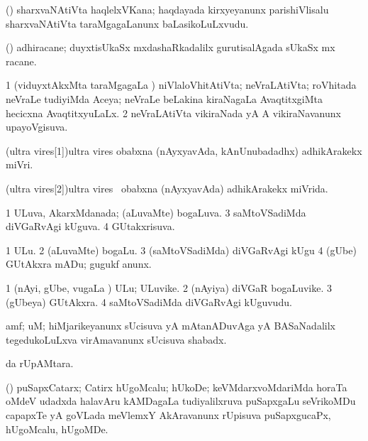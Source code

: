 \bentry
{}
\gl{\nA}
\expl{}
\bmng
(\veYshA) sharxvaNAtiVta haqlelxVKana; haqdayada kirxyeyanunx parishiVlisalu sharxvaNAtiVta taraMgagaLanunx baLasikoLuLxvudu. 
\emng
\eentry

\bentry
{} 
\gl{\nA}
\expl{}
\bmng
(\jiVvi) adhiracane; duyxtisUkaSx mxdashaRkadalilx  gurutisalAgada sUkaSx mx racane. 
\emng
\eentry

\bentry
{} 
\gl{\gu}
\expl{}
\bmng
\bnum
\num{1} (viduyxtAkxMta taraMgagaLa \vi) niVlaloVhitAtiVta; neVraLAtiVta; roVhitada neVraLe tudiyiMda Aceya; neVraLe beLakina kiraNagaLa AvaqtitxgiMta hecicxna AvaqtitxyuLaLx. 
\num{2} neVraLAtiVta vikiraNada yA A vikiraNavanunx upayoVgisuva. 
\enum
\emng
\eentry

\bentry
\wordf(ultra vires[1]){ultra vires} 
\gl{\kirxvi}
\expl{\Latin}
\bmng
obabxna (nAyxyavAda, kAnUnubadadhx) adhikArakekx miVri. 
\emng
\eentry

\bentry
\wordf(ultra vires[2]){ultra vires} 
\gl{\gu}
\expl{\Latin}
\bmng
\kanu\ obabxna (nAyxyavAda) adhikArakekx miVrida. 
\emng
\eentry

\bentry
{} 
\gl{\gu}
\expl{}
\bmng
\bnum
\num{1} ULuva, AkarxMdanada; (aLuvaMte) bogaLuva. 
\num{3} saMtoVSadiMda diVGaRvAgi kUguva. 
\num{4} GUtakxrisuva. 
\enum
\emng
\eentry

\bentry
{}
\gl{\akirx}
\expl{}
\bmng
\bnum
\num{1} ULu. 
\num{2} (aLuvaMte) bogaLu. 
\num{3} (saMtoVSadiMda) diVGaRvAgi kUgu 
\num{4} (gUbe) GUtAkxra mADu; gugukf anunx. 
\enum
\emng
\eentry

\bentry
{} 
\gl{\nA}
\expl{}
\bmng
\bnum
\num{1} (nAyi, gUbe, \mo vugaLa \vi) ULu; ULuvike. 
\num{2} (nAyiya) diVGaR bogaLuvike. 
\num{3} (gUbeya) GUtAkxra. 
\num{4} saMtoVSadiMda diVGaRvAgi kUguvudu. 
\enum
\emng
\eentry

\bentry
{}
\gl{\BAavayx}
\bmng
amf; uM; hiMjarikeyanunx sUcisuva yA mAtanADuvAga yA BASaNadalilx tegedukoLuLxva virAmavanunx sUcisuva shabadx. 
\emng
\eentry

\bentry
{}
\gl{\uparx}
\expl{}
\bmng
{} \uparx da rUpAMtara. 
\emng
\eentry

\bentry
{} 
\gl{\nA}
\expl{}
\bmng
(\savi) puSapxCatarx; Catirx hUgoMcalu; hUkoDe; keVMdarxvoMdariMda horaTa oMdeV udadxda halavAru kAMDagaLa tudiyalilxruva puSapxgaLu seVrikoMDu capapxTe yA goVLada meVlemxY AkAravanunx rUpisuva puSapxgucaPx, hUgoMcalu, hUgoMDe. 
\emng
\eentry

